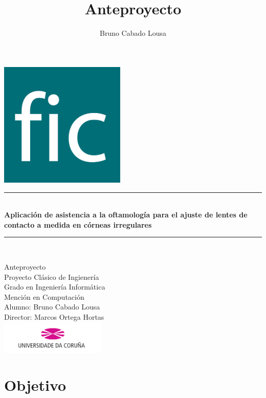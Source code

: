 \documentclass[12pt]{article}
\title{\textbf{Anteproyecto}}
\author{Bruno Cabado Lousa}
\begin{document}

\begin{titlepage}		
	\begin{center}
		\includegraphics[width=6cm]{img/ficlogo.png} \\
		\begin{Large}
			\rule{\linewidth}{0.2 mm} \\[0.4 cm]
			{\fontsize{28}{34}\selectfont\bfseries Aplicación de asistencia a la oftamología para el ajuste de lentes de contacto a medida en córneas irregulares} \\
			\rule{\linewidth}{0.2 mm} \\[0.3 cm]
		\end{Large}
	
		\Large Anteproyecto \\
		\Large Proyecto Clásico de Ingienería \\
		\Large Grado en Ingeniería Informática \\
		\Large Mención en Computación \\ [0.5 cm]

		\Large Alumno: Bruno Cabado Lousa \\ [0.1 cm]
		\Large Director: Marcos Ortega Hortas \\ [0.8 cm]
		\includegraphics[width=5cm]{img/udclogo.png}
		
	\end{center}		
\end{titlepage}

\tableofcontents

\newpage
\section{Objetivo}
\end{document}
